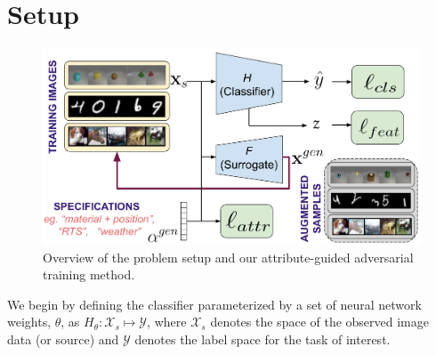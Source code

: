 \section{Setup}
\begin{figure}
    \centering
    \includegraphics[width=\linewidth]{agat/images/overall_new.pdf}
    \caption{Overview of the problem setup and our attribute-guided adversarial training method.}
    \label{fig:problem}
\end{figure}


We begin by defining the classifier parameterized by a set of neural network weights, $\theta$, as
${H}_{\theta}:
\mathcal{X}_s\mapsto \mathcal{Y}$, where $\mathcal{X}_s$ denotes the space of the observed image data (or source) and $\mathcal{Y}$ denotes the label space for the task of interest.


